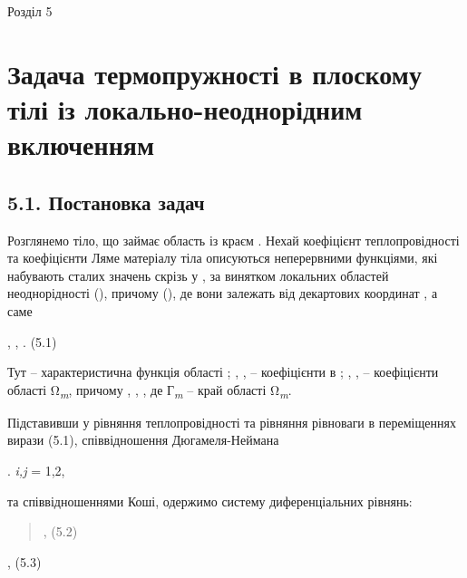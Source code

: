 Розділ 5

\hypertarget{ux437ux430ux434ux430ux447ux430-ux442ux435ux440ux43cux43eux43fux440ux443ux436ux43dux43eux441ux442ux456-ux432-ux43fux43bux43eux441ux43aux43eux43cux443-ux442ux456ux43bux456-ux456ux437-ux43bux43eux43aux430ux43bux44cux43dux43e-ux43dux435ux43eux434ux43dux43eux440ux456ux434ux43dux438ux43c-ux432ux43aux43bux44eux447ux435ux43dux43dux44fux43c}{%
\section{Задача термопружності в плоскому тілі із локально-неоднорідним
включенням}\label{ux437ux430ux434ux430ux447ux430-ux442ux435ux440ux43cux43eux43fux440ux443ux436ux43dux43eux441ux442ux456-ux432-ux43fux43bux43eux441ux43aux43eux43cux443-ux442ux456ux43bux456-ux456ux437-ux43bux43eux43aux430ux43bux44cux43dux43e-ux43dux435ux43eux434ux43dux43eux440ux456ux434ux43dux438ux43c-ux432ux43aux43bux44eux447ux435ux43dux43dux44fux43c}}

\hypertarget{ux43fux43eux441ux442ux430ux43dux43eux432ux43aux430-ux437ux430ux434ux430ux447}{%
\subsection{5.1. Постановка
задач}\label{ux43fux43eux441ux442ux430ux43dux43eux432ux43aux430-ux437ux430ux434ux430ux447}}

Розглянемо тіло, що займає область із краєм . Нехай коефіцієнт
теплопровідності та коефіцієнти Ляме матеріалу тіла описуються
неперервними функціями, які набувають сталих значень скрізь у , за
винятком локальних областей неоднорідності (), причому (), де вони
залежать від декартових координат , а саме

, , . (5.1)

Тут -- характеристична функція області ; , , -- коефіцієнти в ; , , --
коефіцієнти області Ω\emph{\textsubscript{m}}, причому , , , де
Г\emph{\textsubscript{m}} -- край області Ω\emph{\textsubscript{m}}.

Підставивши у рівняння теплопровідності та рівняння рівноваги в
переміщеннях вирази (5.1), співвідношення Дюгамеля-Неймана

. \emph{i,j} = 1,2,

та співвідношеннями Коші, одержимо систему диференціальних рівнянь:

\begin{quote}
, (5.2)
\end{quote}

, (5.3)

